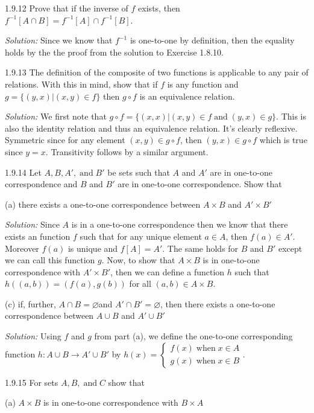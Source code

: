 \documentclass{letter}
\newcommand{\tmop}[1]{\ensuremath{\operatorname{#1}}}
\newcommand{\tmtextit}[1]{{\itshape{#1}}}
\begin{document}
1.9.12 Prove that if the inverse of $f$ exists, then $f^{- 1} [A \cap B] =
f^{- 1} [A] \cap f^{- 1} [B]$.

\tmtextit{Solution:} Since we know that $f^{- 1}$ is one-to-one by definition,
then the equality holds by the the proof from the solution to Exercise 1.8.10.

1.9.13 The definition of the composite of two functions is applicable to any
pair of relations. With this in mind, show that if $f$ is any function and $g
=\{(y, x) | (x, y) \in f\}$ then $g \circ f$ is an equivalence relation.

\tmtextit{Solution:} We first note that $g \circ f =\{(x, x) | (x, y) \in f
\tmop{and} (y, x) \in g\}$. This is also the identity relation and thus an
equivalence relation. It's clearly reflexive. Symmetric since for any element
$(x, y) \in g \circ f$, then $(y, x) \in g \circ f$ which is true since $y =
x$. Transitivity follows by a similar argument.

1.9.14 Let $A, B, A', \tmop{and} B'$ be sets such that $A$ and $A'$ are in
one-to-one correspondence and $B$ and $B'$ are in one-to-one correspondence.
Show that

(a) there exists a one-to-one correspondence between $A \times B$ and $A'
\times B'$

\tmtextit{Solution:} Since $A$ is in a one-to-one correspondence then we know
that there exists an function $f$ such that for any unique element $a \in A$,
then $f (a) \in A'$. Moreover $f (a)$ is unique and $f [A] = A'$. The same
holds for $B$ and $B'$ except we can call this function $g$. Now, to show that
$A \times B$ is in one-to-one correspondence with $A' \times B'$, then we can
define a function $h$ such that $h ((a, b)) = (f (a), g (b))$ for all $(a, b)
\in A \times B$.

(c) if, further, $A \cap B = \varnothing$and $A' \cap B' = \varnothing$, then
there exists a one-to-one correspondence between $A \cup B$ and $A' \cup B'$

\tmtextit{Solution:} Using $f$ and $g$ from part (a), we define the one-to-one
corresponding function $h : A \cup B \rightarrow A' \cup B' $ by $h (x) =
\left\{ \begin{array}{l}
  f (x) \tmop{when} x \in A\\
  g (x) \tmop{when} x \in B
\end{array} \right.$.

1.9.15 For sets $A, B, \tmop{and} C$ show that

(a) $A \times B$ is in one-to-one correspondence with $B \times A$
\end{document}
